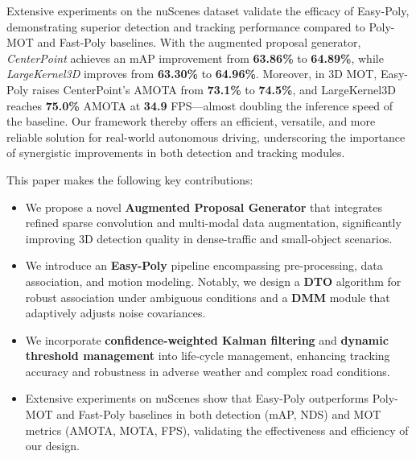 Extensive experiments on the nuScenes dataset validate the efficacy of Easy-Poly, demonstrating superior detection and tracking performance compared to Poly-MOT and Fast-Poly baselines. With the augmented proposal generator, \emph{CenterPoint} achieves an mAP improvement from \textbf{63.86\%} to \textbf{64.89\%}, while \emph{LargeKernel3D} improves from \textbf{63.30\%} to \textbf{64.96\%}. Moreover, in 3D MOT, Easy-Poly raises CenterPoint’s AMOTA from \textbf{73.1\%} to \textbf{74.5\%}, and LargeKernel3D reaches \textbf{75.0\%} AMOTA at \textbf{34.9} FPS—almost doubling the inference speed of the baseline. Our framework thereby offers an efficient, versatile, and more reliable solution for real-world autonomous driving, underscoring the importance of synergistic improvements in both detection and tracking modules.

This paper makes the following key contributions:
\begin{itemize}
    \item We propose a novel \textbf{Augmented Proposal Generator} that integrates refined sparse convolution and multi-modal data augmentation, significantly improving 3D detection quality in dense-traffic and small-object scenarios.
    \item We introduce an \textbf{Easy-Poly} pipeline encompassing pre-processing, data association, and motion modeling. Notably, we design a \textbf{DTO} algorithm for robust association under ambiguous conditions and a \textbf{DMM} module that adaptively adjusts noise covariances.
    \item We incorporate \textbf{confidence-weighted Kalman filtering} and \textbf{dynamic threshold management} into life-cycle management, enhancing tracking accuracy and robustness in adverse weather and complex road conditions.
    \item Extensive experiments on nuScenes show that Easy-Poly outperforms Poly-MOT and Fast-Poly baselines in both detection (mAP, NDS) and MOT metrics (AMOTA, MOTA, FPS), validating the effectiveness and efficiency of our design.
\end{itemize}


